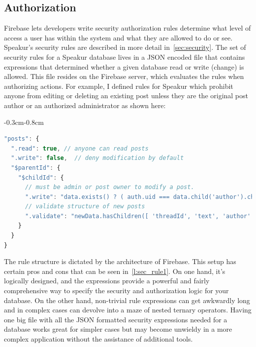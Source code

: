 \subsection{Authorization}
Firebase lets developers write security authorization rules determine what level of access a user has within the system and what they are allowed to do or see.
Speakur's security rules are described in more detail in~\cref{sec:security}.
The set of security rules for a Speakur database lives in a JSON encoded file that contains expressions that determined whether a given database read or write (change) is allowed. 
This file resides on the Firebase server, which evaluates the rules when authorizing actions.
For example, I defined rules for Speakur which prohibit anyone from editing or deleting an existing post unless they are the original post author or an authorized administrator as shown here:

\begin{changemargin}{-0.3cm}{-0.8cm}
\begin{lstlisting}[language=JavaScript,caption=
{Security rules for the \tcode{posts} table (user messages).},label=l:sec_rule1,captionpos=below]
"posts": {
  ".read": true, // anyone can read posts
  ".write": false,  // deny modification by default
  "$parentId": {
    "$childId": {
      // must be admin or post owner to modify a post.
      ".write": "data.exists() ? ( auth.uid === data.child('author').child('uid').val() || root.child('admins').child(auth.uid).child('scope').val() === '*' ) : true",
      // validate structure of new posts
      ".validate": "newData.hasChildren([ 'threadId', 'text', 'author' ]) && newData.child('timestamp').val() > 1"
    }
  }
}
\end{lstlisting}
\end{changemargin}

The rule structure is dictated by the architecture of Firebase.
This setup has certain pros and cons that can be seen in~\cref{l:sec_rule1}. 
On one hand, it's logically designed, 
and the expressions provide a powerful and fairly comprehensive way to specify the 
security and authorization logic for your database.
On the other hand, non-trivial rule expressions can get awkwardly long and in complex cases can devolve into a maze of nested ternary operators.
Having one big file with all the JSON formatted security expressions needed for a database works great for simpler cases but may become unwieldy in a more complex application without the assistance of additional tools.

